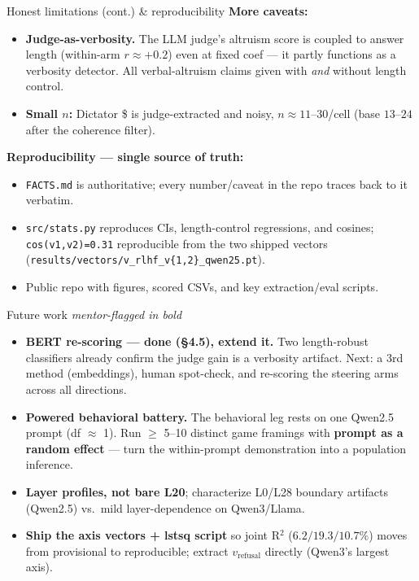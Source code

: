 \documentclass[aspectratio=169,11pt]{beamer}
\begin{document}
\begin{frame}{Honest limitations (cont.) \& reproducibility}
  \textbf{More caveats:}
  \begin{itemize}
    \item \textbf{Judge-as-verbosity.} The LLM judge's altruism score is coupled
      to answer length (within-arm $r \approx +0.2$) even at fixed coef --- it
      partly functions as a verbosity detector. All verbal-altruism claims given
      with \emph{and} without length control.
    \item \textbf{Small $n$:} Dictator \$ is judge-extracted and noisy,
      $n \approx 11\text{--}30$/cell (base $13$--$24$ after the coherence filter).
  \end{itemize}
  \textbf{Reproducibility --- single source of truth:}
  \begin{itemize}
    \item \texttt{FACTS.md} is authoritative; every number/caveat in the repo
      traces back to it verbatim.
    \item \texttt{src/stats.py} reproduces CIs, length-control regressions, and
      cosines; \texttt{cos(v1,v2)=0.31} reproducible from the two shipped vectors
      (\texttt{results/vectors/v\_rlhf\_v\{1,2\}\_qwen25.pt}).
    \item Public repo with figures, scored CSVs, and key extraction/eval scripts.
  \end{itemize}
\end{frame}

\begin{frame}{Future work \hfill {\small\itshape mentor-flagged in bold}}
  \begin{itemize}
    \item \textbf{BERT re-scoring --- done (\S4.5), extend it.} Two length-robust classifiers
      already confirm the judge gain is a verbosity artifact. Next: a 3rd method (embeddings),
      human spot-check, and re-scoring the steering arms across all directions.
    \item \textbf{Powered behavioral battery.} The behavioral leg rests on one Qwen2.5 prompt
      (df $\approx$ 1). Run $\geq$ 5--10 distinct game framings with \textbf{prompt as a random
      effect} --- turn the within-prompt demonstration into a population inference.
    \item \textbf{Layer profiles, not bare L20}; characterize L0/L28 boundary artifacts (Qwen2.5)
      vs.\ mild layer-dependence on Qwen3/Llama.
    \item \textbf{Ship the axis vectors + lstsq script} so joint R$^2$ ($6.2/19.3/10.7\%$) moves
      from provisional to reproducible; extract $v_{\text{refusal}}$ directly (Qwen3's largest axis).
  \end{itemize}
\end{frame}
\end{document}

